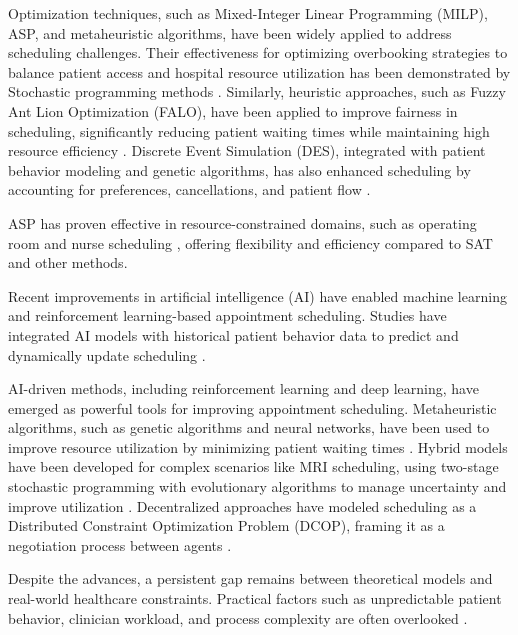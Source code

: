 \documentclass{tlp}
\begin{document}
Optimization techniques, such as Mixed-Integer Linear Programming (MILP), ASP, and metaheuristic algorithms, have been widely applied to address scheduling challenges. Their effectiveness for optimizing overbooking strategies to balance patient access and hospital resource utilization has been demonstrated by Stochastic programming methods \citep{kuo2020medical}. Similarly, heuristic approaches, such as Fuzzy Ant Lion Optimization (FALO), have been applied to improve fairness in scheduling, significantly reducing patient waiting times while maintaining high resource efficiency \citep{ala2022appointment}. Discrete Event Simulation (DES), integrated with patient behavior modeling and genetic algorithms, has also enhanced scheduling by accounting for preferences, cancellations, and patient flow \citep{fan2021outpatient}.

ASP has proven effective in resource-constrained domains, such as operating room \citep{dodaro2024operating} and nurse scheduling \citep{alviano2019nurse}, offering flexibility and efficiency compared to SAT and other methods.

Recent improvements in artificial intelligence (AI) have enabled machine learning and reinforcement learning-based appointment scheduling. Studies have integrated AI models with historical patient behavior data to predict and dynamically update scheduling \citep{ala2022appointment2}.

AI-driven methods, including reinforcement learning and deep learning, have emerged as powerful tools for improving appointment scheduling. Metaheuristic algorithms, such as genetic algorithms and neural networks, have been used to improve resource utilization by minimizing patient waiting times \citep{niu2023review}. Hybrid models have been developed for complex scenarios like MRI scheduling, using two-stage stochastic programming with evolutionary algorithms to manage uncertainty and improve utilization \citep{qiu2019mri}. Decentralized approaches have modeled scheduling as a Distributed Constraint Optimization Problem (DCOP), framing it as a negotiation process between agents \citep{hannebauer2001distributed}.

Despite the advances, a persistent gap remains between theoretical models and real-world healthcare constraints. Practical factors such as unpredictable patient behavior, clinician workload, and process complexity are often overlooked \citep{kuiper2021problem}. 
\end{document}
